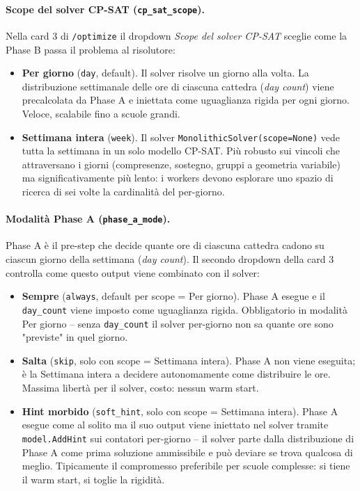 \paragraph{Scope del solver CP-SAT (\texttt{cp\_sat\_scope}).}
Nella card 3 di \texttt{/optimize} il dropdown \emph{Scope del
solver CP-SAT} sceglie come la Phase B passa il problema al
risolutore:
\begin{itemize}
  \item \textbf{Per giorno} (\texttt{day}, default).
        Il solver risolve un giorno alla volta. La distribuzione
        settimanale delle ore di ciascuna cattedra (\emph{day count})
        viene precalcolata da Phase A e iniettata come uguaglianza
        rigida per ogni giorno. Veloce, scalabile fino a scuole grandi.
  \item \textbf{Settimana intera} (\texttt{week}).
        Il solver \texttt{MonolithicSolver(scope=None)} vede tutta
        la settimana in un solo modello CP-SAT. Pi\`u robusto sui
        vincoli che attraversano i giorni (compresenze, sostegno,
        gruppi a geometria variabile) ma significativamente pi\`u
        lento: i workers devono esplorare uno spazio di ricerca di
        sei volte la cardinalit\`a del per-giorno.
\end{itemize}

\paragraph{Modalit\`a Phase A (\texttt{phase\_a\_mode}).}
Phase A \`e il pre-step che decide quante ore di ciascuna cattedra
cadono su ciascun giorno della settimana (\emph{day count}). Il
secondo dropdown della card 3 controlla come questo output viene
combinato con il solver:
\begin{itemize}
  \item \textbf{Sempre} (\texttt{always}, default per scope = Per
        giorno). Phase A esegue e il \texttt{day\_count} viene
        imposto come uguaglianza rigida. Obbligatorio in modalit\`a
        Per giorno -- senza \texttt{day\_count} il solver per-giorno
        non sa quante ore sono "previste" in quel giorno.
  \item \textbf{Salta} (\texttt{skip}, solo con scope = Settimana
        intera). Phase A non viene eseguita; \`e la Settimana intera
        a decidere autonomamente come distribuire le ore. Massima
        libert\`a per il solver, costo: nessun warm start.
  \item \textbf{Hint morbido} (\texttt{soft\_hint}, solo con scope
        = Settimana intera). Phase A esegue come al solito ma il
        suo output viene iniettato nel solver tramite
        \texttt{model.AddHint} sui contatori per-giorno -- il solver
        parte dalla distribuzione di Phase A come prima soluzione
        ammissibile e pu\`o deviare se trova qualcosa di meglio.
        Tipicamente il compromesso preferibile per scuole complesse:
        si tiene il warm start, si toglie la rigidit\`a.
\end{itemize}

